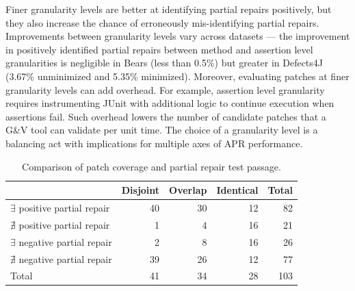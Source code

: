 \documentclass[10pt, conference]{IEEEtran}
\begin{document}
Finer granularity levels are better at identifying partial repairs positively,
but they also increase the chance of erroneously mis-identifying partial repairs.
Improvements between granularity levels vary across datasets --- the improvement 
in positively identified partial repairs between method and assertion level granularities
is negligible in Bears (less than 0.5\%) but greater in Defects4J (3.67\% unminimized and 5.35\% minimized).
Moreover, evaluating patches at finer granularity levels can add overhead.
For example, assertion level granularity requires instrumenting JUnit with additional
logic to continue execution when assertions fail.
Such overhead lowers the number of
candidate patches that a G\&V tool can validate per unit time.
The choice of a granularity level is a balancing act with implications for
multiple axes of APR performance.

\begin{table}
        {\begin{center}
                        \begin{tabular} {lrrrr}
                                \toprule
                                & Disjoint & Overlap & Identical & Total \\
                                \midrule
                                $\exists$ positive partial repair & 40 & 30 & 12 & 82 \\
                                $\nexists$ positive partial repair & 1 & 4 & 16 &  21 \\
                \midrule
                                $\exists$ negative partial repair & 2 & 8 & 16 & 26 \\
                                $\nexists$ negative partial repair & 39 & 26 & 12 & 77 \\
                \midrule
                                Total & 41 & 34 & 28 & 103 \\
                \bottomrule
                        \end{tabular}
                \end{center}
        }
        \caption{Comparison of patch coverage and partial repair
        test passage.}
        \label{tab:cov_fitness}
\end{table}
\end{document}

